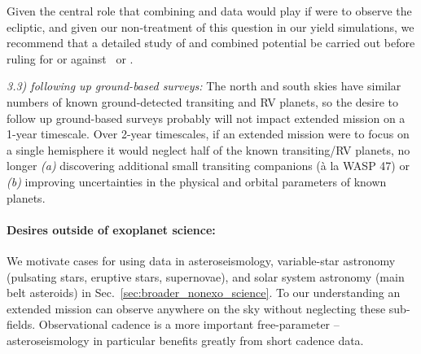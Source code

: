 Given the central role that combining \tess and \ktwo data would play if \tess were to observe the ecliptic, and given our non-treatment of this question in our yield simulations, we recommend that a detailed study of \ktwo and \tesss combined potential be carried out before ruling for or against \elong\ or \eshort.

\textit{3.3) \tess following up ground-based surveys:}
The north and south skies have similar numbers of known ground-detected transiting and RV planets, so the desire to follow up ground-based surveys probably will not impact \tesss extended mission on a 1-year timescale.
Over 2-year timescales, if an extended mission were to focus on a single hemisphere it would neglect half of the known transiting/RV planets, no longer \textit{(a)} discovering additional small transiting companions (\`a la WASP 47) or \textit{(b)} improving uncertainties in the physical and orbital parameters of known planets.


\paragraph{Desires outside of exoplanet science:}
We motivate cases for using \tess data in asteroseismology, variable-star astronomy (pulsating stars, eruptive stars, supernovae), and solar system astronomy (main belt asteroids) in Sec.~\ref{sec:broader_nonexo_science}.
To our understanding an extended mission can observe anywhere on the sky without neglecting these sub-fields.
Observational cadence is a more important free-parameter -- asteroseismology in particular benefits greatly from short cadence data.


